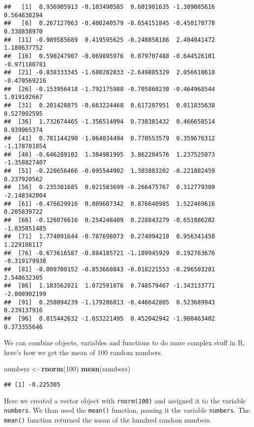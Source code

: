 \documentclass[
]{book}
\newenvironment{Shaded}{\begin{snugshade}}{\end{snugshade}}
\newcommand{\DecValTok}[1]{\textcolor[rgb]{0.00,0.00,0.81}{#1}}
\newcommand{\KeywordTok}[1]{\textcolor[rgb]{0.13,0.29,0.53}{\textbf{#1}}}
\newcommand{\NormalTok}[1]{#1}
\newcommand{\StringTok}[1]{\textcolor[rgb]{0.31,0.60,0.02}{#1}}
\begin{document}
\begin{verbatim}
##   [1]  0.936905913 -0.103490585  0.601901635 -1.309085616  0.564638294
##   [6]  0.267127063 -0.400240579 -0.654151845 -0.450170778  0.338838970
##  [11] -0.989585689  0.419595625 -0.240858186  2.404041472  1.180637752
##  [16]  0.590247907 -0.069895976  0.079707488 -0.644526101 -0.971180781
##  [21] -0.838333345 -1.680202033 -2.649885329  2.056610610 -0.470569216
##  [26] -0.153956418 -1.792175988 -0.705860230 -0.464968544  1.019102667
##  [31]  0.201428875 -0.663224468  0.617287951  0.011835638  0.527002595
##  [36]  1.732674465 -1.356514094  0.738381432  0.466658514  0.939965374
##  [41]  0.781144290 -1.064034494  0.770553579  0.359676312 -1.178701854
##  [46] -0.646289102  1.304981995  3.862204576  1.237525073 -1.358827407
##  [51] -0.220656466 -0.095544902  1.303883202 -0.221882459  0.237920562
##  [56]  0.235301685  0.021583699 -0.266475767  0.312779309 -2.148342004
##  [61] -0.476629916  0.089607342  0.876640985  1.522469616  0.205839722
##  [66] -0.126076616  0.254248409  0.228843279 -0.651086202 -1.835851485
##  [71]  1.774091644 -0.787698073  0.274094218  0.956341450  1.229108117
##  [76] -0.673616587 -0.884185721 -1.189945929  0.192763676 -0.319179938
##  [81] -0.009700152 -0.853660843 -0.018221553 -0.296503281  2.548632305
##  [86]  1.183562021  1.072591876  0.748579467 -1.343133771 -2.008902199
##  [91]  0.258094239 -1.179286813 -0.446642805  0.523689943  0.239137916
##  [96]  0.015442632 -1.653221495  0.452042942 -1.908463402  0.373355646
\end{verbatim}

We can combine objects, variables and functions to do more complex stuff in R, here's how we get the mean of 100 random numbers.

\begin{Shaded}
\begin{Highlighting}[]
\NormalTok{numbers <-}\StringTok{ }\KeywordTok{rnorm}\NormalTok{(}\DecValTok{100}\NormalTok{)}
\KeywordTok{mean}\NormalTok{(numbers)}
\end{Highlighting}
\end{Shaded}

\begin{verbatim}
## [1] -0.225305
\end{verbatim}

Here we created a vector object with \texttt{rnorm(100)} and assigned it to the variable \texttt{numbers}. We than used the \texttt{mean()} function, passing it the variable \texttt{numbers}. The \texttt{mean()} function returned the mean of the hundred random numbers.
\end{document}
